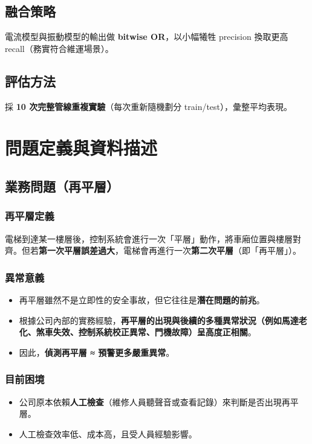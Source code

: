 \documentclass[12pt,a4paper]{article}
\begin{document}
\subsection{融合策略}
電流模型與振動模型的輸出做 \textbf{bitwise OR}，以小幅犧牲 precision 換取更高 recall（務實符合維運場景）。

\subsection{評估方法}
採 \textbf{10 次完整管線重複實驗}（每次重新隨機劃分 train/test），彙整平均表現。

\section{問題定義與資料描述}

\subsection{業務問題（再平層）}

\subsubsection{再平層定義}
電梯到達某一樓層後，控制系統會進行一次「平層」動作，將車廂位置與樓層對齊。但若\textbf{第一次平層誤差過大}，電梯會再進行一次\textbf{第二次平層}（即「再平層」）。

\subsubsection{異常意義}
\begin{itemize}
    \item 再平層雖然不是立即性的安全事故，但它往往是\textbf{潛在問題的前兆}。
    \item 根據公司內部的實務經驗，\textbf{再平層的出現與後續的多種異常狀況（例如馬達老化、煞車失效、控制系統校正異常、門機故障）呈高度正相關}。
    \item 因此，\textbf{偵測再平層 ≈ 預警更多嚴重異常}。
\end{itemize}

\subsubsection{目前困境}
\begin{itemize}
    \item 公司原本依賴\textbf{人工檢查}（維修人員聽聲音或查看記錄）來判斷是否出現再平層。
    \item 人工檢查效率低、成本高，且受人員經驗影響。
\end{itemize}
\end{document}
